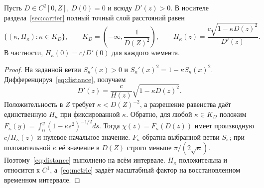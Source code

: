 \section{}\label{sec:exact}
\begin{theorem}\label{thm:completion}
{Пусть $D\in C^2[0,Z]$, $D(0)=0$ и всюду $D'(z)>0$. В носителе раздела~\ref{sec:carrier} полный точный слой расстояний равен}
\begin{equation}\label{eq:completion}
 \{(\kappa,H_\kappa):\kappa\in K_D\},\qquad
 K_D=\left(-\infty,\frac1{D(Z)^2}\right),\qquad
 H_\kappa(z)=\frac{c\sqrt{1-\kappa D(z)^2}}{D'(z)}.
\end{equation}
{В частности, $H_\kappa(0)=c/D'(0)$ для каждого элемента.}
\end{theorem}
\begin{proof}
{На заданной ветви $S_\kappa'(x)>0$ и $S_\kappa'(x)^2=1-\kappa S_\kappa(x)^2$. Дифференцируя~\eqref{eq:distance}, получаем}
\begin{equation}\label{eq:derivative}
 D'(z)=\frac c{H(z)}\sqrt{1-\kappa D(z)^2}.
\end{equation}
{Положительность в $Z$ требует $\kappa<D(Z)^{-2}$, а разрешение равенства даёт единственную $H_\kappa$ при фиксированной $\kappa$. Обратно, для любой $\kappa\in K_D$ положим $F_\kappa(y)=\int_0^y(1-\kappa s^2)^{-1/2}ds$. Тогда $\chi(z)=F_\kappa(D(z))$ имеет производную $c/H_\kappa(z)$ и нулевое начальное значение. $F_\kappa$ обратна выбранной ветви $S_\kappa$; при положительной $\kappa$ её значение в $D(Z)$ строго меньше $\pi/(2\sqrt\kappa)$. Поэтому~\eqref{eq:distance} выполнено на всём интервале. $H_\kappa$ положительна и относится к $C^1$, а~\eqref{eq:metric} задаёт масштабный фактор на восстановленном временном интервале.}
\end{proof}

